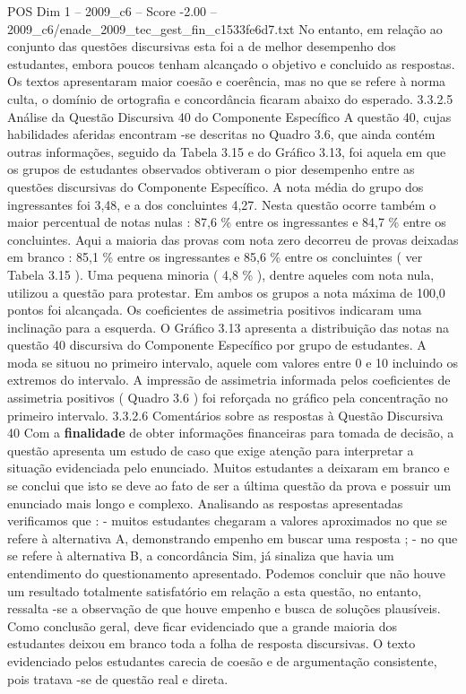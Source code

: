 \begin{textsample}{POS Dim 1 – 2009\_c6 – Score -2.00 – 2009\_c6/enade\_2009\_tec\_gest\_fin\_c1533fe6d7.txt}
No entanto, em relação ao conjunto das questões discursivas esta foi a de melhor desempenho dos estudantes, embora poucos tenham alcançado o objetivo e concluido as respostas.
Os textos apresentaram maior coesão e coerência, mas no que se refere à norma culta, o domínio de ortografia e concordância ficaram abaixo do esperado. 3.3.2.5 Análise da Questão Discursiva 40 do Componente Específico A questão 40, cujas habilidades aferidas encontram -se descritas no Quadro 3.6, que ainda contém outras informações, seguido da Tabela 3.15 e do Gráfico 3.13, foi aquela em que os grupos de estudantes observados obtiveram o pior desempenho entre as questões discursivas do Componente Específico.
A nota média do grupo dos ingressantes foi 3,48, e a dos concluintes 4,27.
Nesta questão ocorre também o maior percentual de notas nulas : 87,6 \% entre os ingressantes e 84,7 \% entre os concluintes.
Aqui a maioria das provas com nota zero decorreu de provas deixadas em branco : 85,1 \% entre os ingressantes e 85,6 \% entre os concluintes ( ver Tabela 3.15 ).
Uma pequena minoria ( 4,8 \% ), dentre aqueles com nota nula, utilizou a questão para protestar.
Em ambos os grupos a nota máxima de 100,0 pontos foi alcançada.
Os coeficientes de assimetria positivos indicaram uma inclinação para a esquerda.
O Gráfico 3.13 apresenta a distribuição das notas na questão 40 discursiva do Componente Específico por grupo de estudantes.
A moda se situou no primeiro intervalo, aquele com valores entre 0 e 10 incluindo os extremos do intervalo.
A impressão de assimetria informada pelos coeficientes de assimetria positivos ( Quadro 3.6 ) foi reforçada no gráfico pela concentração no primeiro intervalo. 3.3.2.6 Comentários sobre as respostas à Questão Discursiva 40 Com a \textbf{finalidade} de obter informações financeiras para tomada de decisão, a questão apresenta um estudo de caso que exige atenção para interpretar a situação evidenciada pelo enunciado.
Muitos estudantes a deixaram em branco e se conclui que isto se deve ao fato de ser a última questão da prova e possuir um enunciado mais longo e complexo.
Analisando as respostas apresentadas verificamos que : - muitos estudantes chegaram a valores aproximados no que se refere à alternativa A, demonstrando empenho em buscar uma resposta ; - no que se refere à alternativa B, a concordância Sim, já sinaliza que havia um entendimento do questionamento apresentado.
Podemos concluir que não houve um resultado totalmente satisfatório em relação a esta questão, no entanto, ressalta -se a observação de que houve empenho e busca de soluções plausíveis.
Como conclusão geral, deve ficar evidenciado que a grande maioria dos estudantes deixou em branco toda a folha de resposta discursivas.
O texto evidenciado pelos estudantes carecia de coesão e de argumentação consistente, pois tratava -se de questão real e direta.

\end{textsample}
